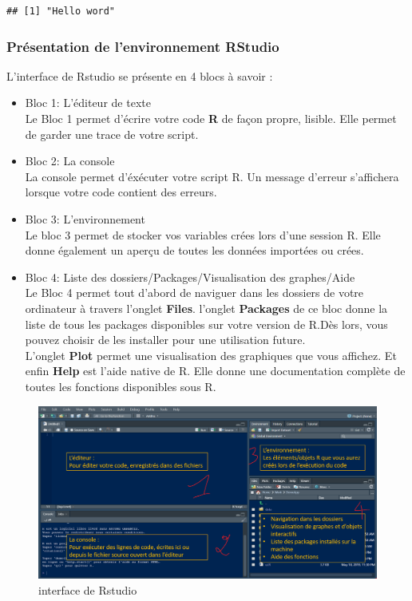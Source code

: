 \documentclass[
]{article}
\begin{document}
\begin{verbatim}
## [1] "Hello word"
\end{verbatim}

\hypertarget{pruxe9sentation-de-lenvironnement-rstudio}{%
\subsubsection{Présentation de l'environnement
RStudio}\label{pruxe9sentation-de-lenvironnement-rstudio}}

L'interface de Rstudio se présente en 4 blocs à savoir :

\begin{itemize}
\item
  Bloc 1: L'éditeur de texte\\
  Le Bloc 1 permet d'écrire votre code \textbf{R} de façon propre,
  lisible. Elle permet de garder une trace de votre script.
\item
  Bloc 2: La console\\
  La console permet d'éxécuter votre script R. Un message d'erreur
  s'affichera lorsque votre code contient des erreurs.
\item
  Bloc 3: L'environnement\\
  Le bloc 3 permet de stocker vos variables crées lors d'une session R.
  Elle donne également un aperçu de toutes les données importées ou
  crées.
\item
  Bloc 4: Liste des dossiers/Packages/Visualisation des graphes/Aide\\
  Le Bloc 4 permet tout d'abord de naviguer dans les dossiers de votre
  ordinateur à travers l'onglet \textbf{Files}. l'onglet
  \textbf{Packages} de ce bloc donne la liste de tous les packages
  disponibles sur votre version de R.Dès lors, vous pouvez choisir de
  les installer pour une utilisation future.\\
  L'onglet \textbf{Plot} permet une visualisation des graphiques que
  vous affichez. Et enfin \textbf{Help} est l'aide native de R. Elle
  donne une documentation complète de toutes les fonctions disponibles
  sous R.
\end{itemize}

\begin{figure}
\centering
\includegraphics{interface Rstudio.png}
\caption{interface de Rstudio}
\end{figure}
\end{document}
